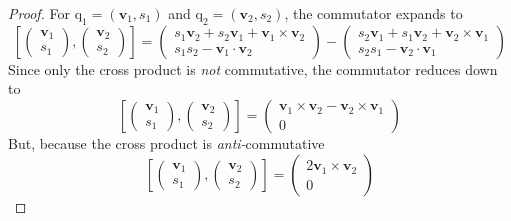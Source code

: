\documentclass{amsart}
\theoremstyle{definition}
\theoremstyle{remark}
\numberwithin{equation}{section}
\begin{document}
\begin{proof}
  For $\mathrm{q}_1=(\mathbf{v}_1, s_1)$ and $\mathrm{q}_2=(\mathbf{v}_2, s_2)$, the commutator expands to
  \begin{equation}
    \left[
    \begin{pmatrix}
      \mathbf{v}_1 \\
      s_1
    \end{pmatrix} ,
    \begin{pmatrix}
      \mathbf{v}_2 \\
      s_2
    \end{pmatrix}
    \right] =
    \begin{pmatrix}
      s_1\mathbf{v}_2 + s_2\mathbf{v}_1 + \mathbf{v}_1 \times \mathbf{v}_2 \\
      s_1s_2 - \mathbf{v}_1 \cdot \mathbf{v}_2
    \end{pmatrix} -
    \begin{pmatrix}
      s_2\mathbf{v}_1 + s_1\mathbf{v}_2 + \mathbf{v}_2 \times \mathbf{v}_1 \\
      s_2s_1 - \mathbf{v}_2 \cdot \mathbf{v}_1
    \end{pmatrix} \nonumber
  \end{equation}
  Since only the cross product is \emph{not} commutative, the commutator reduces down to
  \begin{equation}
    \left[
    \begin{pmatrix}
      \mathbf{v}_1 \\
      s_1
    \end{pmatrix} ,
    \begin{pmatrix}
      \mathbf{v}_2 \\
      s_2
    \end{pmatrix}
    \right] =
    \begin{pmatrix}
      \mathbf{v}_1\times\mathbf{v}_2-\mathbf{v}_2\times\mathbf{v}_1 \\
      0
    \end{pmatrix} \nonumber
  \end{equation}
  But, because the cross product is \emph{anti-}commutative
  \begin{equation}
    \left[
    \begin{pmatrix}
      \mathbf{v}_1 \\
      s_1
    \end{pmatrix} ,
    \begin{pmatrix}
      \mathbf{v}_2 \\
      s_2
    \end{pmatrix}
    \right] =
    \begin{pmatrix}
      2\mathbf{v}_1\times\mathbf{v}_2\\
      0
    \end{pmatrix} \nonumber
  \end{equation}
\end{proof}
\end{document}
